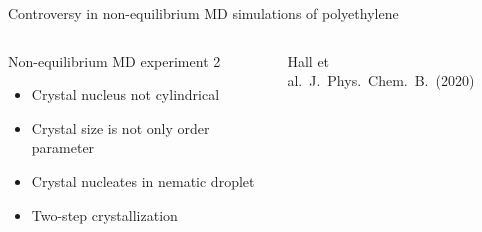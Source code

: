 \documentclass[aspectratio=169]{beamer}
\begin{document}
\begin{frame}[c]{Controversy in non-equilibrium MD simulations of polyethylene}
\begin{columns}[T]
    \begin{block}{Non-equilibrium MD experiment 2}
      \begin{itemize}
        \item Crystal nucleus not cylindrical
        \item Crystal size is not only order parameter
        \item Crystal nucleates in nematic droplet
        \item Two-step crystallization
      \end{itemize}
    \end{block}

    \vspace{4pt}
    {\small{}Hall et al.~J.~Phys.~Chem.~B.~(2020)\par}

  \end{columns}

%
%
%

\end{frame}
\end{document}
